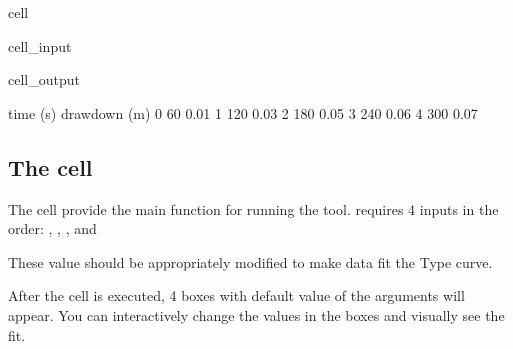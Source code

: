 \documentclass[letterpaper,10pt,english]{jupyterBook}
\begin{document}
\begin{sphinxuseclass}{cell}
\begin{sphinxVerbatimInput}
\begin{sphinxuseclass}{cell_input}
\begin{sphinxVerbatim}[commandchars=\\\{\}]
     
    
 
\end{sphinxVerbatim}

\end{sphinxuseclass}\end{sphinxVerbatimInput}
\begin{sphinxVerbatimOutput}

\begin{sphinxuseclass}{cell_output}
\begin{sphinxVerbatim}[commandchars=\\\{\}]
   time (s)  drawdown (m)
0        60          0.01
1       120          0.03
2       180          0.05
3       240          0.06
4       300          0.07
\end{sphinxVerbatim}

\end{sphinxuseclass}\end{sphinxVerbatimOutput}

\end{sphinxuseclass}

\subsection{The   cell}
\label{\detokenize{content/tools/type_curve_fit:the-main-function-cell}}
\sphinxAtStartPar
The cell provide the main function  for running the tool.  requires 4 inputs in the order: , , , and 

\sphinxAtStartPar
These value should be appropriately modified to make data fit the Type curve.

\sphinxAtStartPar
After the cell is executed, 4 boxes with default value of the arguments will appear. You can interactively change the values in the boxes and visually see the fit.
\end{document}
